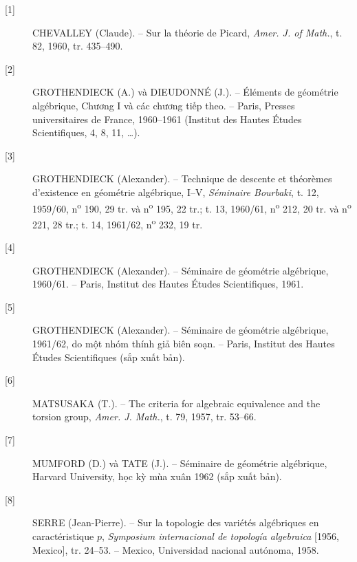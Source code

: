 \begin{description}
\item[{[1]}] CHEVALLEY (Claude). -- Sur la théorie de Picard,
\emph{Amer. J. of Math.}, t. 82, 1960, tr. 435--490.

\item[{[2]}] GROTHENDIECK (A.) và DIEUDONNÉ (J.). -- Éléments de géométrie
algébrique, Chương I và các chương tiếp theo. -- Paris, Presses universitaires
de France, 1960--1961 (Institut des Hautes Études Scientifiques, 4, 8, 11,
\ldots).

\item[{[3]}] GROTHENDIECK (Alexander). -- Technique de descente et théorèmes
d'existence en géométrie algébrique, I--V, \emph{Séminaire Bourbaki}, t. 12,
1959/60, n\textsuperscript{o} 190, 29 tr. và n\textsuperscript{o} 195, 22 tr.;
t. 13, 1960/61, n\textsuperscript{o} 212, 20 tr. và
n\textsuperscript{o} 221, 28 tr.; t. 14, 1961/62,
n\textsuperscript{o} 232, 19 tr.

\item[{[4]}] GROTHENDIECK (Alexander). -- Séminaire de géométrie algébrique,
1960/61. -- Paris, Institut des Hautes Études Scientifiques, 1961.

\item[{[5]}] GROTHENDIECK (Alexander). -- Séminaire de géométrie algébrique,
1961/62, do một nhóm thính giả biên soạn. -- Paris, Institut des Hautes Études
Scientifiques (sắp xuất bản).

\item[{[6]}] MATSUSAKA (T.). -- The criteria for algebraic equivalence and the
torsion group, \emph{Amer. J. Math.}, t. 79, 1957, tr. 53--66.

\item[{[7]}] MUMFORD (D.) và TATE (J.). -- Séminaire de géométrie algébrique,
Harvard University, học kỳ mùa xuân 1962 (sắp xuất bản).

\item[{[8]}] SERRE (Jean-Pierre). -- Sur la topologie des variétés algébriques
en caractéristique $p$, \emph{Symposium internacional de topología algebraica}
[1956, Mexico], tr. 24--53. -- Mexico, Universidad nacional autónoma, 1958.
\end{description}

\par
